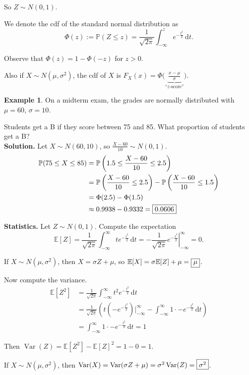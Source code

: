 \documentclass[a4paper,11pt]{amsbook}
\theoremstyle{definition}
\newtheorem{example}{\hspace{-2em} \color{darkblue} Example}[chapter]
\theoremstyle{remark}
\newcommand{\E}{\mathbb{E}}
\renewcommand{\P}{\mathbb{P}}
\DeclareMathOperator\Var{Var}
\newcommand\0{\varnothing}
\newcommand\dt[1][t]{\,\mathrm{d}#1}
\begin{document}
    So $Z\sim N(0,1)$.

    We denote the cdf of the standard normal distribution as 
    $$\Phi(z):=\P(Z\leq z)=\frac1{\sqrt{2\pi}}\int_{-\infty}^ze^{-\frac{t^2}{2}}\dt.$$

    Observe that $\Phi(z)=1-\Phi(-z)$ for $z>0$.

    Also if $X\sim N(\mu,\sigma^2)$, the cdf of $X$ is $F_X(x)=\Phi\bigg(\underbrace{\frac{x-\mu}{\sigma}}_{\text{``$z$-score''}}\bigg).$

    \begin{example}
        On a midterm exam, the grades are normally distributed with $\mu=60$, $\sigma=10$.

        Students get a B if they score between 75 and 85. What proportion of students get a B?\\
        \textbf{Solution.} Let $X\sim N(60,10)$, so $\frac{X-60}{10}\sim N(0,1)$.
        \begin{align*}
            \P(75\leq X\leq 85)&=\P\left(1.5\leq\frac{X-60}{10}\leq2.5\right) \\
            &=\P\left(\frac{X-60}{10}\leq2.5\right)-\P\left(\frac{X-60}{10}\leq1.5\right) \\
            &=\Phi(2.5)-\Phi(1.5) \\
            &\approx0.9938-0.9332=\fbox{0.0606}
        \end{align*}
    \end{example}

    \textbf{Statistics.} Let $Z\sim N(0,1)$. Compute the expectation
    $$\E[Z]=\frac1{\sqrt{2\pi}}\int_{-\infty}^{\infty}te^{-\frac{t^2}2}\dt=-\frac1{\sqrt{2\pi}}\left.e^{-\frac{t^2}2}\right|_{-\infty}^\infty=0.$$

    If $X\sim N(\mu,\sigma^2)$, then $X=\sigma Z+\mu$, so $\E[X]=\sigma\E[Z]+\mu=\fbox{$\mu$}$.

    Now compute the variance. \begin{align*}
        \E[Z^2]&=\frac{1}{\sqrt{2\pi}}\int_{-\infty}^{\infty}t^2e^{-\frac{t^2}2}\dt \\
        &=\frac{1}{\sqrt{2\pi}}\left(t(-e^{-\frac{t^2}2})\big|_{-\infty}^{\infty}-\int_{-\infty}^{\infty}1\cdot-e^{-\frac{t^2}2}\dt\right) \\
        &=\int_{-\infty}^{\infty}1\cdot-e^{-\frac{t^2}2}\dt=1
    \end{align*}

    Then $\Var(Z)=\E[Z^2]-\E[Z]^2=1-0=1$.

    If $X\sim N(\mu,\sigma^2)$, then $\Var(X)=\Var(\sigma Z+\mu)=\sigma^2\Var(Z)=\fbox{$\sigma^2$}$.
\end{document}
